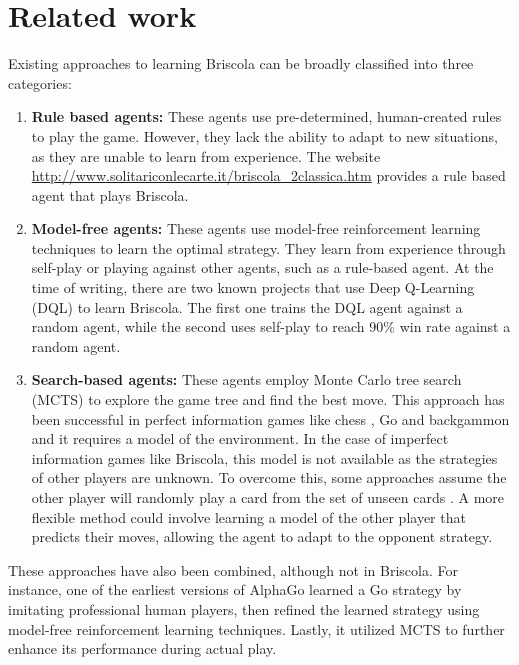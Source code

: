 \section{Related work}
Existing approaches to learning Briscola can be broadly classified into three categories:
\begin{enumerate}
    \item \textbf{Rule based agents:} These agents use pre-determined, human-created rules to play the game. However, they lack the ability to adapt to new situations, as they are unable to learn from experience. The website \url{http://www.solitariconlecarte.it/briscola_2classica.htm} provides a rule based agent that plays Briscola.
    \item \textbf{Model-free agents:} These agents use model-free reinforcement learning techniques to learn the optimal strategy. They learn from experience through self-play or playing against other agents, such as a rule-based agent. At the time of writing, there are two known projects that use Deep Q-Learning (DQL) \cite{mnih2013playing} to learn Briscola. The first one \cite{fezriva-briscola-dqn} trains the DQL agent against a random agent, while the second \cite{alsora-deep-briscola-dqn} uses self-play to reach 90\% win rate against a random agent.
    \item \textbf{Search-based agents:} These agents employ Monte Carlo tree search (MCTS) to explore the game tree and find the best move. This approach has been successful in perfect information games like chess \cite{alphazero}, Go \cite{alphagozero} and backgammon \cite{td-gammon} and it requires a model of the environment. In the case of imperfect information games like Briscola, this model is not available as the strategies of other players are unknown. To overcome this, some approaches assume the other player will randomly play a card from the set of unseen cards \cite{Briscola-mcts-Playing-Algorithm}. A more flexible method could involve learning a model of the other player that predicts their moves, allowing the agent to adapt to the opponent strategy.
\end{enumerate}
These approaches have also been combined, although not in Briscola. For instance, one of the earliest versions of AlphaGo \cite{alphago-fan} learned a Go strategy by imitating professional human players, then refined the learned strategy using model-free reinforcement learning techniques. Lastly, it utilized MCTS to further enhance its performance during actual play.\\\\
